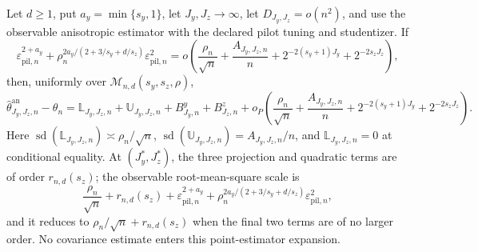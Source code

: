 Let \(d\ge1\), put \(a_y=\min\{s_y,1\}\), let \(J_y,J_z\to\infty\), let \(D_{J_y,J_z}=o(n^2)\), and use the observable anisotropic estimator with the declared pilot tuning and studentizer. If
\[
\varepsilon_{\mathrm{pil},n}^{2+a_y}+\rho_n^{2a_y/(2+3/s_y+d/s_z)}\varepsilon_{\mathrm{pil},n}^2
=o\!\left(\frac{\rho_n}{\sqrt n}+\frac{A_{J_y,J_z,n}}n+2^{-2(s_y+1)J_y}+2^{-2s_zJ_z}\right),
\]
then, uniformly over \(\mathcal M_{n,d}(s_y,s_z,\rho)\),
\[
\widehat\theta^{\mathrm{an}}_{J_y,J_z,n}-\theta_n=\mathbb L_{J_y,J_z,n}+\mathbb U_{J_y,J_z,n}+B^y_{J_y,n}+B^z_{J_z,n}+o_P\!\left(\frac{\rho_n}{\sqrt n}+\frac{A_{J_y,J_z,n}}n+2^{-2(s_y+1)J_y}+2^{-2s_zJ_z}\right).
\]
Here \(\operatorname{sd}(\mathbb L_{J_y,J_z,n})\asymp\rho_n/\sqrt n\), \(\operatorname{sd}(\mathbb U_{J_y,J_z,n})=A_{J_y,J_z,n}/n\), and \(\mathbb L_{J_y,J_z,n}=0\) at conditional equality. At \((J_y^*,J_z^*)\), the three projection and quadratic terms are of order \(r_{n,d}(s_z)\); the observable root-mean-square scale is
\[
\frac{\rho_n}{\sqrt n}+r_{n,d}(s_z)+\varepsilon_{\mathrm{pil},n}^{2+a_y}+\rho_n^{2a_y/(2+3/s_y+d/s_z)}\varepsilon_{\mathrm{pil},n}^2,
\]
and it reduces to \(\rho_n/\sqrt n+r_{n,d}(s_z)\) when the final two terms are of no larger order. No covariance estimate enters this point-estimator expansion.